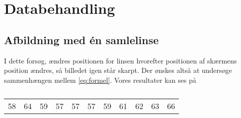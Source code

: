 \section{Databehandling}
\subsection{Afbildning med én samlelinse}
I dette forsøg, ændres positionen for linsen hvorefter positionen af skærmens position ændres, så billedet igen står skarpt. Der ønskes altså at undersøge sammenhængen mellem \cref{eq:formel}.
Vores resultater kan ses på
\begin{table}[H]
    \begin{tabular}{c|c|c|c|c|c|c|c|c|c|c}
        58 &  64 &  59 &  57 &  57 &  57  & 59  & 61  & 62  & 63  & 66
    \end{tabular}
    \caption{}
    \label{}

\end{table}
